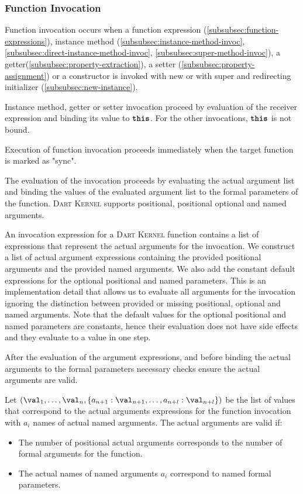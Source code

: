 \documentclass[a4paper,oneside,fleqn]{article}
\newcommand{\kernel}{\textsc{Dart Kernel}}
\newcommand{\synt}[1]{\ensuremath{\text{\textbf{\texttt{#1}}}}}
\newcommand{\this}{\synt{this}}
\begin{document}
\subsubsection{Function Invocation}
\label{subsubsec:function-invoc}

Function invocation occurs when a function expression (\ref{subsubsec:function-expressions}), instance method (\ref{subsubsec:instance-method-invoc}, \ref{subsubsec:direct-instance-method-invoc}, \ref{subsubsec:super-method-invoc}), a getter(\ref{subsubsec:property-extraction}), a setter (\ref{subsubsec:property-assignment}) or a constructor is invoked with new or with super and redirecting initializer (\ref{subsubsec:new-instance}).

Instance method, getter or setter invocation proceed by evaluation of the receiver expression and binding its value to $\this$.
For the other invocations, $\this$ is not bound.

Execution of function invocation proceeds immediately when the target function is marked as "sync".

The evaluation of the invocation proceeds by evaluating the actual argument list and binding the values of the evaluated argument list to the formal parameters of the function.
\kernel{} supports positional, positional optional and named arguments.

An invocation expression for a \kernel{} function contains a list of expressions that represent the actual arguments for the invocation.
We construct a list of actual argument expressions containing the provided positional arguments and the provided named arguments.
We also add the constant default expressions for the optional positional and named parameters.
This is an implementation detail that allows us to evaluate all arguments for the invocation ignoring the distinction between provided or missing positional, optional and named arguments.
Note that the default values for the optional positional and named parameters are constants, hence their evaluation does not have side effects and they evaluate to a value in one step.

After the evaluation of the argument expressions, and before binding the actual arguments to the formal parameters necessary checks ensure the actual arguments are valid.

Let $(\val_1, \dots, \val_n, \{a_{n+1} : \val_{n+1}, \dots, a_{n+l} : \val_{n+l}\})$ be the list of values that correspond to the actual arguments expressions for the function invocation with $a_i$ names of actual named arguments.
The actual arguments are valid if:
\begin{itemize}
\item The number of positional actual arguments corresponds to the number of formal arguments for the function.
\item The actual names of named arguments $a_i$ correspond to named formal parameters.
\end{itemize}
\end{document}
